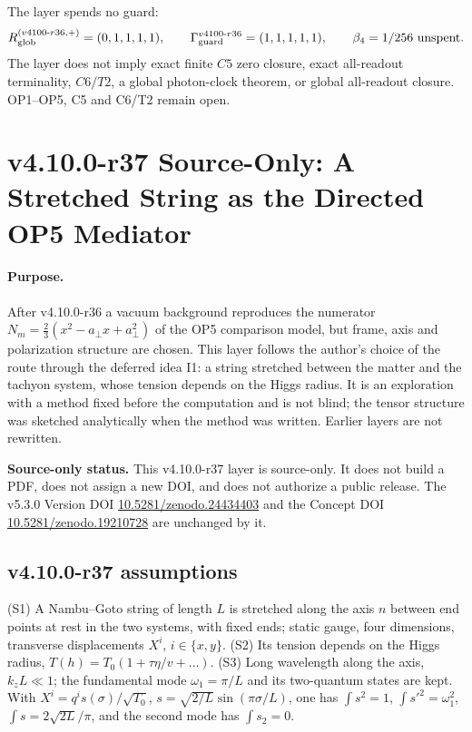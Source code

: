 The layer spends no guard:
\[
R_{\rm glob}^{(v4100\text{-}r36,+)}=(0,1,1,1,1),
\qquad
\Gamma_{\rm guard}^{v4100\text{-}r36}=(1,1,1,1,1),
\qquad
\beta_4=1/256\ \text{unspent}.
\]
The layer does not imply exact finite \(C5\) zero closure, exact all-readout terminality, \(C6/T2\), a global photon-clock theorem,
or global all-readout closure.  OP1--OP5, C5 and C6/T2 remain open.

\clearpage
\section*{v4.10.0-r37 Source-Only: A Stretched String as the Directed OP5 Mediator}
\label{sec:v4100-r37-string-mediator}

\paragraph{Purpose.}
After v4.10.0-r36 a vacuum background reproduces the numerator \(N_m=\tfrac23(x^2-a_\perp x+a_\perp^2)\) of the OP5 comparison model, but frame, axis and
polarization structure are chosen.  This layer follows the author's choice of the route through the deferred idea I1: a string stretched
between the matter and the tachyon system, whose tension depends on the Higgs radius.  It is an exploration with a method fixed before the
computation and is not blind; the tensor structure was sketched analytically when the method was written.  Earlier layers are not rewritten.

\noindent\textbf{Source-only status.}
This v4.10.0-r37 layer is source-only.  It does not build a PDF, does not assign a new DOI,
and does not authorize a public release.  The v5.3.0 Version DOI
\href{https://doi.org/10.5281/zenodo.24434403}{10.5281/zenodo.24434403} and the Concept DOI
\href{https://doi.org/10.5281/zenodo.19210728}{10.5281/zenodo.19210728} are unchanged by it.

\subsection*{v4.10.0-r37 assumptions}
\label{subsec:v4100-r37-assumptions}

(S1) A Nambu--Goto string of length \(L\) is stretched along the axis \(n\) between end points at rest in the two systems, with fixed ends;
static gauge, four dimensions, transverse displacements \(X^i\), \(i\in\{x,y\}\).  (S2) Its tension depends on the Higgs radius,
\(T(h)=T_0(1+\tau\eta/v+\dots)\).  (S3) Long wavelength along the axis, \(k_zL\ll1\); the fundamental mode \(\omega_1=\pi/L\) and its two-quantum states are kept.
With \(X^i=q^i s(\sigma)/\sqrt{T_0}\), \(s=\sqrt{2/L}\sin(\pi\sigma/L)\), one has \(\int s^2=1\), \(\int s'^2=\omega_1^2\), \(\int s=2\sqrt{2L}/\pi\), and the second mode has
\(\int s_2=0\).

